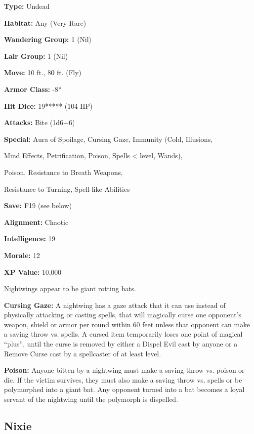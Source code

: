 \begin{multicols*}{2}
{\textbf{Type:} Undead

\textbf{Habitat:} Any (Very Rare)

\textbf{Wandering Group:} 1 (Nil)

\textbf{Lair Group:} 1 (Nil)

\textbf{Move:} 10 ft., 80 ft. (Fly)

\textbf{Armor Class:} -8*

\textbf{Hit Dice:} 19***** (104 HP)

\textbf{Attacks:} Bite (1d6+6)

\textbf{Special:} Aura of Spoilage, Cursing Gaze, Immunity (Cold, Illusions, 

Mind Effects, Petrification, Poison, Spells <  level, Wands), 

Poison, Resistance to Breath Weapons, 

Resistance to Turning, Spell-like Abilities

\textbf{Save:} F19 (see below)

\textbf{Alignment:} Chaotic

\textbf{Intelligence:} 19

\textbf{Morale:} 12

\textbf{XP Value:} 10,000}

Nightwings appear to be giant rotting bats.

\textbf{Cursing Gaze:} A nightwing has a gaze attack that it can use instead of physically attacking or casting spells, that will magically curse one opponent’s weapon, shield or armor per round within 60 feet unless that opponent can make a saving throw vs. spells. A cursed item temporarily loses one point of magical “plus”, until the curse is removed by either a Dispel Evil cast by anyone or a Remove Curse cast by a spellcaster of at least  level.

\textbf{Poison:} Anyone bitten by a nightwing must make a saving throw vs. poison or die. If the victim survives, they must also make a saving throw vs. spells or be polymorphed into a giant bat. Any opponent turned into a bat becomes a loyal servant of the nightwing until the polymorph is dispelled.

\subsection{Nixie}
\end{multicols*}
